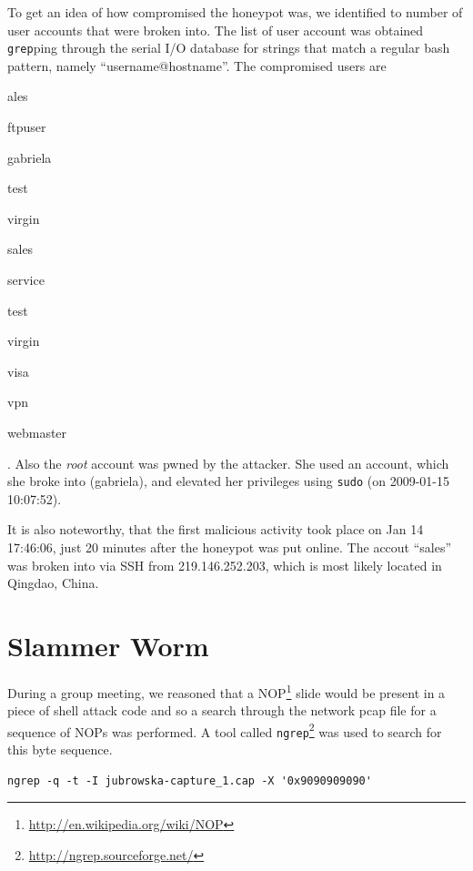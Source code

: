 \documentclass[a4paper,
    11pt,
    normalheadings,
    parindent,
    UKenglish,
    abstracton,
    ]{scrartcl}
\begin{document}
To get an idea of how compromised the honeypot was, we identified to number of user accounts that were broken into.
The list of user account was obtained \texttt{grep}ping through the serial I/O database for strings that match a regular bash pattern, namely ``username@hostname''.
The compromised users are
\begin{inparaitem}
    \item ales
    \item ftpuser
    \item gabriela
    \item test
    \item virgin
    \item sales
    \item service
    \item test
    \item virgin
    \item visa
    \item vpn
    \item webmaster
\end{inparaitem}.
Also the \emph{root} account was pwned by the attacker.
She used an account, which she broke into (gabriela), and elevated her privileges using \texttt{sudo} (on 2009-01-15 10:07:52).

It is also noteworthy, that the first malicious activity took place on  Jan 14 17:46:06, just 20 minutes after the honeypot was put online.
The accout ``sales'' was broken into via SSH from  219.146.252.203, which is most likely located in Qingdao, China.





\section{Slammer Worm} \label{sec:slammer}

During a group meeting, we reasoned that a NOP\footnote{\url{http://en.wikipedia.org/wiki/NOP}} slide would be present in a piece of shell attack code and so a search through the network pcap file for a sequence of NOPs was performed.
A tool called \texttt{ngrep}\footnote{\url{http://ngrep.sourceforge.net/}} was used to search for this byte sequence.

\begin{verbatim}
ngrep -q -t -I jubrowska-capture_1.cap -X '0x9090909090'
\end{verbatim}
\end{document}
